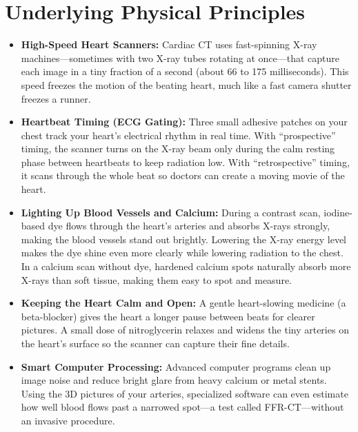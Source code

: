 \section{Underlying Physical Principles}
\begin{itemize}
    \item \textbf{High-Speed Heart Scanners:} Cardiac CT uses fast-spinning X-ray machines---sometimes with two X-ray tubes rotating at once---that capture each image in a tiny fraction of a second (about 66 to 175 milliseconds). This speed freezes the motion of the beating heart, much like a fast camera shutter freezes a runner.
    \item \textbf{Heartbeat Timing (ECG Gating):} Three small adhesive patches on your chest track your heart's electrical rhythm in real time. With ``prospective'' timing, the scanner turns on the X-ray beam only during the calm resting phase between heartbeats to keep radiation low. With ``retrospective'' timing, it scans through the whole beat so doctors can create a moving movie of the heart.
    \item \textbf{Lighting Up Blood Vessels and Calcium:} During a contrast scan, iodine-based dye flows through the heart's arteries and absorbs X-rays strongly, making the blood vessels stand out brightly. Lowering the X-ray energy level makes the dye shine even more clearly while lowering radiation to the chest. In a calcium scan without dye, hardened calcium spots naturally absorb more X-rays than soft tissue, making them easy to spot and measure.
    \item \textbf{Keeping the Heart Calm and Open:} A gentle heart-slowing medicine (a beta-blocker) gives the heart a longer pause between beats for clearer pictures. A small dose of nitroglycerin relaxes and widens the tiny arteries on the heart's surface so the scanner can capture their fine details.
    \item \textbf{Smart Computer Processing:} Advanced computer programs clean up image noise and reduce bright glare from heavy calcium or metal stents. Using the 3D pictures of your arteries, specialized software can even estimate how well blood flows past a narrowed spot---a test called FFR-CT---without an invasive procedure.
\end{itemize}

